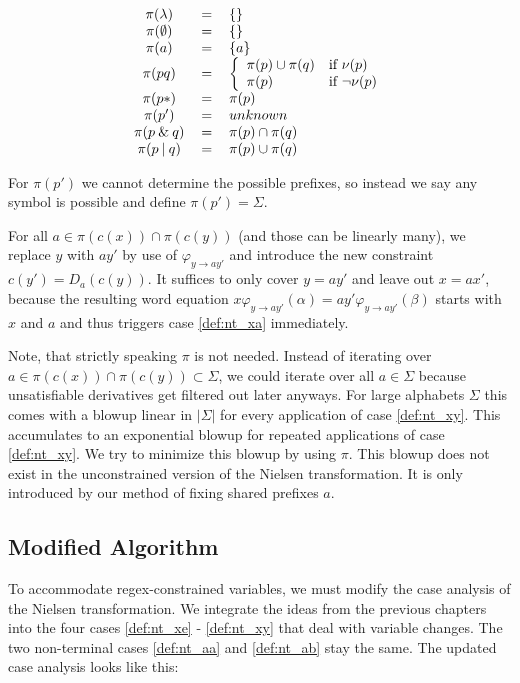 \[
\begin{tabular}{c c l}
    $\pi(\lambda)$ & $=$ & $\{\}$ \\
    $\pi(\emptyset)$ & $=$ & $\{\}$ \\
    $\pi(a)$ & $=$ & $\{a\}$ \\
    
    $\pi(pq)$ & $=$ & $
        \left\{
    	\begin{array}{ll}
    		\pi(p) \cup \pi(q)  & \mbox{if } \nu(p) \\
    		\pi(p) & \mbox{if } \neg \nu(p)
    	\end{array}
        \right.
    $\\
    
    $\pi(p*)$ & $=$ & $\pi(p)$ \\
    $\pi(p')$ & $=$ & $unknown$ \\
    $\pi(p\:\&\:q)$ & $=$ & $\pi(p) \cap \pi(q)$ \\
    $\pi(p\:|\:q)$ & $=$ & $\pi(p) \cup \pi(q)$ \\
\end{tabular}
\]

For $\pi(p')$ we cannot determine the possible prefixes, so instead we say any symbol is possible and define $\pi(p') = \Sigma$.

For all $a \in \pi(c(x)) \cap \pi(c(y))$ (and those can be linearly many), we replace $y$ with $ay'$ by use of $\varphi_{y \rightarrow ay'}$ and introduce the new constraint $c(y') = D_a(c(y))$. It suffices to only cover $y = ay'$ and leave out $x = ax'$, because the resulting word equation $x\varphi_{y \rightarrow ay'}(\alpha) = ay'\varphi_{y \rightarrow ay'}(\beta)$ starts with $x$ and $a$ and thus triggers case \ref{def:nt_xa} immediately.

Note, that strictly speaking $\pi$ is not needed. Instead of iterating over $a \in \pi(c(x)) \cap \pi(c(y)) \subset \Sigma$, we could iterate over all $a \in \Sigma$ because unsatisfiable derivatives get filtered out later anyways. For large alphabets $\Sigma$ this comes with a blowup linear in $|\Sigma|$ for every application of case \ref{def:nt_xy}. This accumulates to an exponential blowup for repeated applications of case \ref{def:nt_xy}. We try to minimize this blowup by using $\pi$. This blowup does not exist in the unconstrained version of the Nielsen transformation. It is only introduced by our method of fixing shared prefixes $a$.

\subsection{Modified Algorithm} \label{ss_rnt}
To accommodate regex-constrained variables, we must modify the case analysis of the Nielsen transformation. We integrate the ideas from the previous chapters into the four cases \ref{def:nt_xe} - \ref{def:nt_xy} that deal with variable changes. The two non-terminal cases \ref{def:nt_aa} and \ref{def:nt_ab} stay the same. The updated case analysis looks like this:

